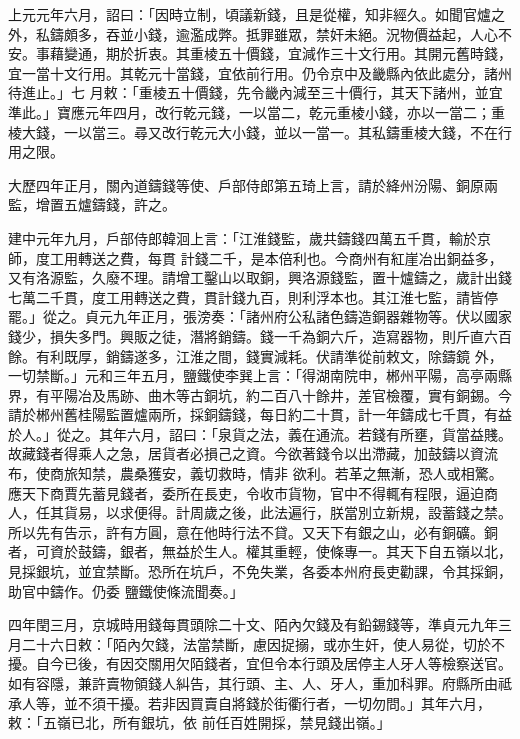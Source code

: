 \begin{pinyinscope}
 上元元年六月，詔曰：「因時立制，頃議新錢，且是從權，知非經久。如聞官爐之外，私鑄頗多，吞並小錢，逾濫成弊。抵罪雖眾，禁奸未絕。況物價益起，人心不安。事藉變通，期於折衷。其重棱五十價錢，宜減作三十文行用。其開元舊時錢，宜一當十文行用。其乾元十當錢，宜依前行用。仍令京中及畿縣內依此處分，諸州待進止。」七
 月敕：「重棱五十價錢，先令畿內減至三十價行，其天下諸州，並宜準此。」寶應元年四月，改行乾元錢，一以當二，乾元重棱小錢，亦以一當二；重棱大錢，一以當三。尋又改行乾元大小錢，並以一當一。其私鑄重棱大錢，不在行用之限。



 大歷四年正月，關內道鑄錢等使、戶部侍郎第五琦上言，請於絳州汾陽、銅原兩監，增置五爐鑄錢，許之。



 建中元年九月，戶部侍郎韓洄上言：「江淮錢監，歲共鑄錢四萬五千貫，輸於京師，度工用轉送之費，每貫
 計錢二千，是本倍利也。今商州有紅崖冶出銅益多，又有洛源監，久廢不理。請增工鑿山以取銅，興洛源錢監，置十爐鑄之，歲計出錢七萬二千貫，度工用轉送之費，貫計錢九百，則利浮本也。其江淮七監，請皆停罷。」從之。貞元九年正月，張滂奏：「諸州府公私諸色鑄造銅器雜物等。伏以國家錢少，損失多門。興販之徒，潛將銷鑄。錢一千為銅六斤，造寫器物，則斤直六百餘。有利既厚，銷鑄遂多，江淮之間，錢實減耗。伏請準從前敕文，除鑄鏡
 外，一切禁斷。」元和三年五月，鹽鐵使李巽上言：「得湖南院申，郴州平陽，高亭兩縣界，有平陽冶及馬跡、曲木等古銅坑，約二百八十餘井，差官檢覆，實有銅錫。今請於郴州舊桂陽監置爐兩所，採銅鑄錢，每日約二十貫，計一年鑄成七千貫，有益於人。」從之。其年六月，詔曰：「泉貨之法，義在通流。若錢有所壅，貨當益賤。故藏錢者得乘人之急，居貨者必損己之資。今欲著錢令以出滯藏，加鼓鑄以資流布，使商旅知禁，農桑獲安，義切救時，情非
 欲利。若革之無漸，恐人或相驚。應天下商賈先蓄見錢者，委所在長吏，令收市貨物，官中不得輒有程限，逼迫商人，任其貨易，以求便得。計周歲之後，此法遍行，朕當別立新規，設蓄錢之禁。所以先有告示，許有方圓，意在他時行法不貸。又天下有銀之山，必有銅礦。銅者，可資於鼓鑄，銀者，無益於生人。權其重輕，使條專一。其天下自五嶺以北，見採銀坑，並宜禁斷。恐所在坑戶，不免失業，各委本州府長吏勸課，令其採銅，助官中鑄作。仍委
 鹽鐵使條流聞奏。」



 四年閏三月，京城時用錢每貫頭除二十文、陌內欠錢及有鉛錫錢等，準貞元九年三月二十六日敕：「陌內欠錢，法當禁斷，慮因捉搦，或亦生奸，使人易從，切於不擾。自今已後，有因交關用欠陌錢者，宜但令本行頭及居停主人牙人等檢察送官。如有容隱，兼許賣物領錢人糾告，其行頭、主、人、牙人，重加科罪。府縣所由祗承人等，並不須干擾。若非因買賣自將錢於街衢行者，一切勿問。」其年六月，敕：「五嶺已北，所有銀坑，依
 前任百姓開採，禁見錢出嶺。」




\end{pinyinscope}
